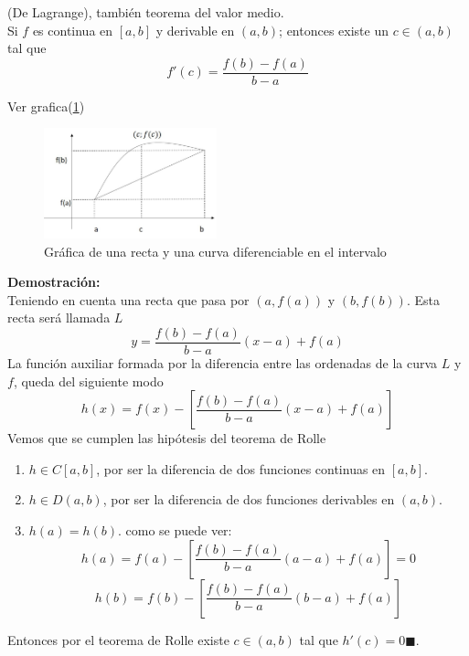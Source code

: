 \documentclass[10pt,twoside]{SelfArx} %
\begin{document}
 
  
 \begin{teorema}
 	(De Lagrange), también teorema del valor medio.\\
 	Si $ f $ es continua en $ [a,b] $ y derivable en $ (a,b) $; entonces existe un $ c\in(a,b) $ tal que 
 	\begin{equation}
 	f'(c)=\dfrac{f(b)-f(a)}{b-a}\label{valorMedio}
 	\end{equation}
  \end{teorema}
 Ver grafica(\ref{lagrange1})
 \begin{figure}[h]
 	\centering
 	\includegraphics[width=5cm]{lagrange1}
 	\caption{Gráfica de una recta y una curva diferenciable en el intervalo}
 	\label{lagrange1}
 \end{figure}
 \textbf{Demostración:}\\
 Teniendo en cuenta una recta que pasa por $ (a,f(a)) $ y $ (b,f(b)) $. Esta recta será llamada $ L $
 \begin{equation}
 y=\dfrac{f(b)-f(a)}{b-a}(x-a)+f(a)
 \end{equation}
 La función auxiliar formada por la diferencia entre las ordenadas de la curva $ L $ y $ f $, queda del siguiente modo
 \begin{equation}
 h(x)=f(x)-\left [ \dfrac{f(b)-f(a)}{b-a}(x-a)+f(a)\right ]
 \end{equation}
 Vemos que se cumplen  las hipótesis del teorema de Rolle
 \begin{enumerate}
 	\item $ h\in C[a,b] $, por ser la diferencia de dos funciones continuas en $ [a,b] $.
 	\item $ h\in D(a,b) $, por ser la diferencia de dos funciones derivables en $ (a,b) $.
 	\item $ h(a)=h(b) $. como se puede ver:
 	\[ h(a)=f(a)-\left [ \dfrac{f(b)-f(a)}{b-a}(a-a)+f(a)\right ]=0 \]
 	\[ h(b)=f(b)-\left [ \dfrac{f(b)-f(a)}{b-a}(b-a)+f(a)\right ] \]
 \end{enumerate}
 Entonces por el teorema de Rolle existe $ c\in(a,b) $ tal que $ h'(c)=0 \blacksquare$.\\
 
\end{document}
